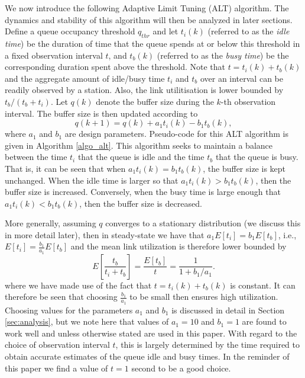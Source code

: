 \documentclass[10pt,twocolumn, journal]{IEEEtran}
\def\DLaddition#1{\noindent\ {\color{black} #1}}
\begin{document}
We now introduce the following Adaptive Limit Tuning (ALT) algorithm.  The dynamics and stability of this algorithm will then be analyzed in later sections. \DLaddition{Define a queue occupancy threshold $q_{thr}$ and let $t_i(k)$ (referred to as the \emph{idle time}) be the duration of time that the queue spends at or below this threshold in a fixed observation interval $t$, and $t_b(k)$ (referred to as the \emph{busy time}) be the corresponding duration spent above the threshold.  Note that $t=t_i(k)+t_b(k)$ and the aggregate amount of idle/busy time $t_i$ and $t_b$ over an interval can be readily observed by a station.  Also, the link utilitisation is lower bounded by $t_b/(t_b+t_i)$.  Let $q(k)$ denote the buffer size during the $k$-th observation interval.}  The buffer size is then updated according to
\begin{equation}
    q(k+1)  =  q(k) + a_1 t_i(k) - b_1 t_b(k),
    \label{eqn_buffer_dynamic_per_interval}
\end{equation}
where $a_1$ and $b_1$ are design parameters. Pseudo-code for
this ALT algorithm is given in Algorithm \ref{algo_alt}.   This algorithm seeks to maintain a balance between the time $t_i$ that the queue is idle and the time $t_b$ that the queue is busy.  That is, it can be seen that when $a_1 t_i(k) = b_1 t_b(k)$, the buffer size is kept unchanged.  When the idle time is larger so that $a_1 t_i(k) > b_1 t_b(k)$, then the buffer size is increased.  Conversely, when the busy time is large enough that $a_1 t_i(k) < b_1 t_b(k)$, then the buffer size is decreased.

More generally, assuming $q$ converges to a stationary distribution (we discuss this in more detail
later), then in steady-state we have that $a_1E[t_i]=b_1E[t_b]$, i.e., $E[t_i]=\frac{b_1}{a_1}E[t_b]$ and the mean link utilization is therefore lower bounded by
\begin{equation}
    E[\frac{t_b}{t_i+t_b}] = \frac{E[t_b]}{t} =\frac{1}{1+b_1/a_1}.
    \label{eqn_lowerbound}
\end{equation}
where we have made use of the fact that  $t=t_i(k)+t_b(k)$ is constant.  It can therefore be seen that choosing $\frac{b_1}{a_1}$ to be small then ensures high utilization.   Choosing values for the parameters $a_1$ and $b_1$ is discussed in detail in Section \ref{sec:analysis},  but we note here that values of $a_1=10$ and $b_1=1$ are found to work well and unless otherwise stated are used in this paper.   With regard to the choice of observation interval $t$, this is largely determined by the time required to obtain accurate estimates of the queue idle and busy times.  In the reminder of this paper we find a value of $t=1$ second to be a good choice.
\end{document}
